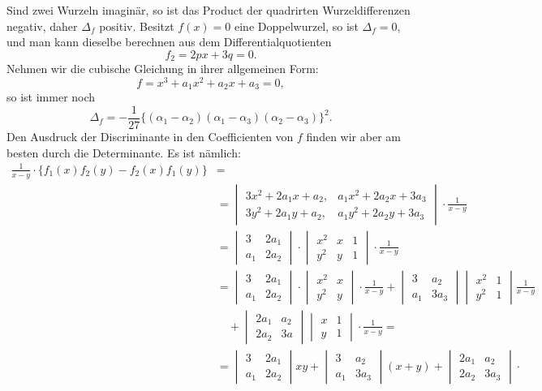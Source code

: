 \documentclass[11pt]{article}
\providecommand{\gesperrt}[1]{\textls[130]{#1}}
\let\Delta\varDelta
\begin{document}
Sind zwei Wurzeln imaginär, so ist das Product der quadrirten Wurzeldifferenzen negativ, daher $\Delta_f$ positiv. Besitzt $f(x)=0$ eine Doppelwurzel, so ist $\Delta_f=0$, und man kann dieselbe berechnen aus dem Differentialquotienten
\[
f_2 = 2px+3q=0.
\]
Nehmen wir die cubische Gleichung in ihrer allgemeinen Form:
\[
f = x^3+a_1x^2+a_2x+a_3=0,
\]
so ist immer noch
\[
\Delta_f = -\frac{1}{27}\{(\alpha_1-\alpha_2)(\alpha_1-\alpha_3)(\alpha_2-\alpha_3)\}^2.
\]
Den Ausdruck der Discriminante in den Coefficienten von $f$ finden wir aber am besten durch die \gesperrt{Cayley'sche} Determinante. Es ist nämlich:
\[
\begin{aligned}
\frac{1}{x-y}\cdot\{f_1(x)f_2(y)-f_2(x)f_1(y)\} &=\\
&= \begin{vmatrix} 3x^2+2a_1x+a_2, & a_1x^2+2a_2x+3a_3 \\ 3y^2+2a_1y+a_2, & a_1y^2+2a_2y+3a_3 \end{vmatrix}\cdot\frac{1}{x-y}\\
&= \begin{vmatrix} 3 & 2a_1 \\ a_1 & 2a_2 \end{vmatrix}\cdot\begin{vmatrix} x^2 & x & 1 \\ y^2 & y & 1 \end{vmatrix}\cdot\frac{1}{x-y}\\
&= \begin{vmatrix} 3 & 2a_1 \\ a_1 & 2a_2 \end{vmatrix}\cdot\begin{vmatrix} x^2 & x \\ y^2 & y \end{vmatrix}\cdot\frac{1}{x-y} + \begin{vmatrix} 3 & a_2 \\ a_1 & 3a_3 \end{vmatrix}\begin{vmatrix} x^2 & 1 \\ y^2 & 1 \end{vmatrix}\frac{1}{x-y}\\
&\quad + \begin{vmatrix} 2a_1 & a_2 \\ 2a_2 & 3a \end{vmatrix}\begin{vmatrix} x & 1 \\ y & 1 \end{vmatrix}\cdot\frac{1}{x-y} = %
\\
&= \begin{vmatrix} 3 & 2a_1 \\ a_1 & 2a_2 \end{vmatrix} xy + \begin{vmatrix} 3 & a_2 \\ a_1 & 3a_3 \end{vmatrix}(x+y) + \begin{vmatrix} 2a_1 & a_2 \\ 2a_2 & 3a_3 \end{vmatrix}\cdot
\end{aligned}
\]
\end{document}
